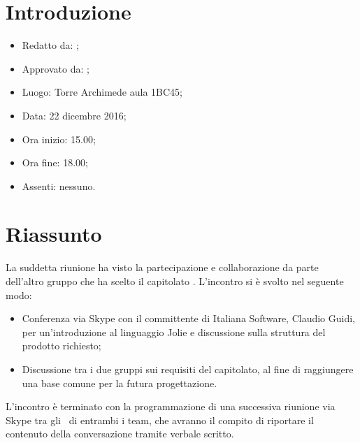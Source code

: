 \section{Introduzione}

	\begin{itemize}
		\item Redatto da: \DS;
		\item Approvato da: \NS;
		\item Luogo: Torre Archimede aula 1BC45;
		\item Data: 22 dicembre 2016;
		\item Ora inizio: 15.00;
		\item Ora fine: 18.00;
		\item Assenti: nessuno.
	\end{itemize}

\section{Riassunto}
La suddetta riunione ha visto la partecipazione e collaborazione da parte dell'altro gruppo che ha scelto il capitolato \progetto. L'incontro si è svolto nel seguente modo:
\begin{itemize}
	\item Conferenza via Skype con il committente di Italiana Software, Claudio Guidi, per un'introduzione al linguaggio Jolie e discussione sulla struttura del prodotto richiesto;
	\item Discussione tra i due gruppi sui requisiti del capitolato, al fine di raggiungere una base comune per la futura progettazione.
\end{itemize}
L'incontro è terminato con la programmazione di una successiva riunione via Skype tra gli \Anas\ di entrambi i team, che avranno il compito di riportare il contenuto della conversazione tramite verbale scritto.